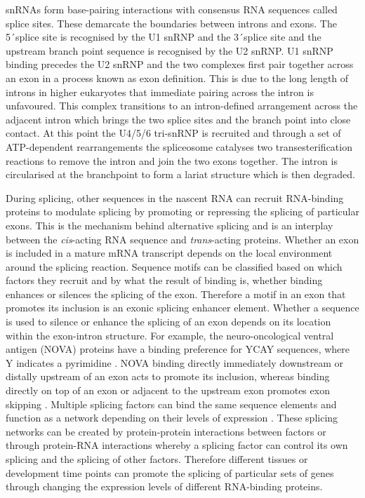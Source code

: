 snRNAs form base-pairing interactions with consensus RNA sequences called splice sites. 
These demarcate the boundaries between introns and exons. 
The 5\'\ splice site is recognised by the U1 snRNP and the 3\'\ splice site and the upstream branch point sequence is recognised by the U2 snRNP.
U1 snRNP binding precedes the U2 snRNP and the two complexes first pair together across an exon in a process known as exon definition. 
This is due to the long length of introns in higher eukaryotes that immediate pairing across the intron is unfavoured.
This complex transitions to an intron-defined arrangement across the adjacent intron which brings the two splice sites and the branch point into close contact.
At this point the U4/5/6 tri-snRNP is recruited and through a set of ATP-dependent rearrangements the spliceosome catalyses two transesterification reactions to remove the intron and join the two exons together.
The intron is circularised at the branchpoint to form a lariat structure which is then degraded.

During splicing, other sequences in the nascent RNA can recruit RNA-binding proteins to modulate splicing by promoting or repressing the splicing of particular exons.
This is the mechanism behind alternative splicing and is an interplay between the \textit{cis}-acting RNA sequence and \textit{trans}-acting proteins.
Whether an exon is included in a mature mRNA transcript depends on the local environment around the splicing reaction.
Sequence motifs can be classified based on which factors they recruit and by what the result of binding is, whether binding enhances or silences the splicing of the exon.
Therefore a motif in an exon that promotes its inclusion is an exonic splicing enhancer element. 
Whether a sequence is used to silence or enhance the splicing of an exon depends on its location within the exon-intron structure.
For example, the neuro-oncological ventral antigen (NOVA) proteins have a binding preference for YCAY sequences, where Y indicates a pyrimidine \citep{Buckanovich1996,Jensen2000}.
NOVA binding directly immediately downstream or distally upstream of an exon acts to promote its inclusion, whereas binding directly on top of an exon or adjacent to the upstream exon promotes exon skipping \citep{Ule2006}.
Multiple splicing factors can bind the same sequence elements and function as a network depending on their levels of expression \citep{Wang2013a}.
These splicing networks can be created by protein-protein interactions between factors or through protein-RNA interactions whereby a splicing factor can control its own splicing and the splicing of other factors. 
Therefore different tissues or development time points can promote the splicing of particular sets of genes through changing the expression levels of different RNA-binding proteins.

